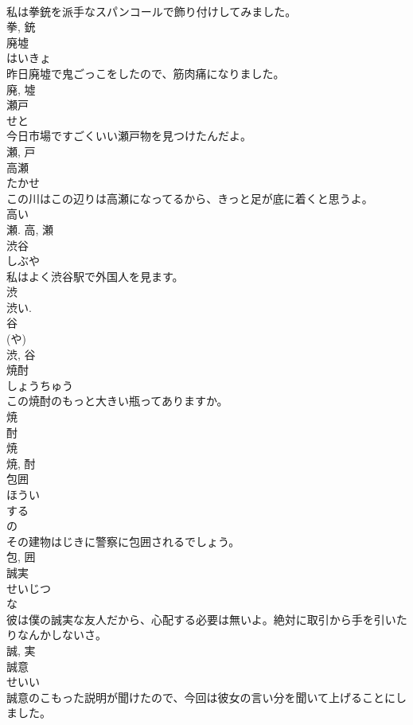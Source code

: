 \documentclass[8pt]{extreport}
\begin{document}
\begin{CJK}{UTF8}{min}
\\	私は拳銃を派手なスパンコールで飾り付けしてみました。	
\\	拳, 銃	
\\	廃墟	
\\	はいきょ	
\\	昨日廃墟で鬼ごっこをしたので、筋肉痛になりました。	
\\	廃, 墟	
\\	瀬戸	
\\	せと	
\\	今日市場ですごくいい瀬戸物を見つけたんだよ。	
\\	瀬, 戸	
\\	高瀬	
\\	たかせ	
\\	この川はこの辺りは高瀬になってるから、きっと足が底に着くと思うよ。	
\\	高い 
\\	瀬.	高, 瀬	
\\	渋谷	
\\	しぶや	
\\	私はよく渋谷駅で外国人を見ます。	
\\	渋 
\\	渋い. 
\\	谷 
\\	(や)
\\	渋, 谷	
\\	焼酎	
\\	しょうちゅう	
\\	この焼酎のもっと大きい瓶ってありますか。	
\\	焼 
\\	酎 
\\	焼 
\\	焼, 酎	
\\	包囲	
\\	ほうい	
\\	する 
\\	の 
\\	その建物はじきに警察に包囲されるでしょう。	
\\	包, 囲	
\\	誠実	
\\	せいじつ	
\\	な 
\\	彼は僕の誠実な友人だから、心配する必要は無いよ。絶対に取引から手を引いたりなんかしないさ。	
\\	誠, 実	
\\	誠意	
\\	せいい	
\\	誠意のこもった説明が聞けたので、今回は彼女の言い分を聞いて上げることにしました。	

\end{CJK}
\end{document}

